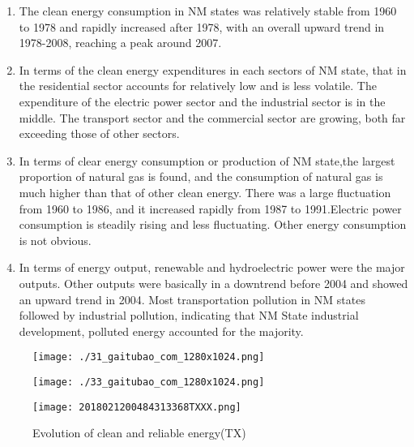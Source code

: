 \documentclass[a4paper]{article}
\begin{document}
\begin{enumerate}
\item The clean energy consumption in NM states was relatively stable from 1960 to 1978 and rapidly increased after 1978, with an overall upward trend in 1978-2008, reaching a peak around 2007.

\item In terms of the clean energy expenditures in each sectors of NM state, that in the residential sector accounts for relatively low and is less volatile. The expenditure of the electric power sector and the industrial sector is in the middle. The transport sector and the commercial sector are growing, both far exceeding those of other sectors.

\item In terms of clear energy consumption or production of NM state,the largest proportion of natural gas is found, and the consumption of natural gas is much higher than that of other clean energy. There was a large fluctuation from 1960 to 1986, and it increased rapidly from 1987 to 1991.Electric power consumption is steadily rising and less fluctuating. Other energy consumption is not obvious.

\item In terms of energy output, renewable and hydroelectric power were the major outputs. Other outputs were basically in a downtrend before 2004 and showed an upward trend in 2004. Most transportation pollution in NM states followed by industrial pollution, indicating that NM State industrial development, polluted energy accounted for the majority.
\end{enumerate} 

\begin{figure}[H]
\begin{minipage}[t]{0.5\linewidth}
\centering
\texttt{[image: ./31\_gaitubao\_com\_1280x1024.png]}
\label{fig:side:a}
\end{minipage}%
\begin{minipage}[t]{0.5\linewidth}
\centering
\texttt{[image: ./33\_gaitubao\_com\_1280x1024.png]}
\label{fig:side:b}
\end{minipage}
\end{figure}

\begin{figure}[H]
	\begin{center}
		\texttt{[image: 2018021200484313368TXXX.png]}
		\caption{Evolution of clean and reliable energy(TX)}
		\label{Fig:1}
	\end{center}
	\vspace{-0.5em}
\end{figure}
\end{document}
